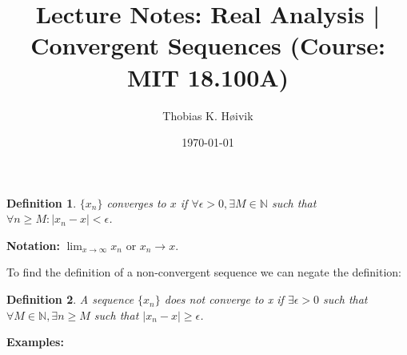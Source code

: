 \documentclass[12pt]{article}
\title{Lecture Notes: Real Analysis | Convergent Sequences (Course: MIT 18.100A)}
\author{Thobias K. Høivik}
\date{\today}
\newtheorem{definition}{Definition}
\begin{document}
\maketitle
\begin{definition}
    \(\{x_n\}\) converges to \(x\) if \(\forall \epsilon > 0, \exists M\in \mathbb N\)
    such that \(\forall n \geq M : |x_n - x| < \epsilon\).
\end{definition}
\noindent
\textbf{Notation:} \(\displaystyle\lim_{x \to \infty} x_n\) or \(x_n \to x\).

\noindent 
To find the definition of a non-convergent sequence we can negate the definition: 
\begin{definition}
    A sequence \(\{x_n\}\) does not converge to x if 
    \(\exists \epsilon > 0\) such that \(\forall M \in \mathbb N, \exists n \geq M\) 
    such that \(|x_n - x| \geq \epsilon\).
\end{definition}
\noindent 
\textbf{Examples:}
\end{document}
